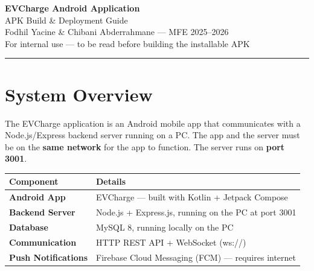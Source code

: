 \documentclass[12pt,a4paper]{article}
\begin{document}

\begin{center}
  {\LARGE\bfseries\color{primary} EVCharge Android Application}\\[0.4em]
  {\large\color{accent} APK Build \& Deployment Guide}\\[0.6em]
  {\normalsize Fodhil Yacine \& Chibani Abderrahmane \quad --- \quad MFE 2025--2026}\\[0.2em]
  {\small\color{gray} For internal use --- to be read before building the installable APK}
\end{center}

\vspace{0.5em}
\noindent\color{accent}\rule{\linewidth}{1.5pt}
\vspace{1em}

\section{System Overview}

The EVCharge application is an Android mobile app that communicates with a
Node.js/Express backend server running on a PC. The app and the server must be
on the \textbf{same network} for the app to function. The server runs on
\textbf{port 3001}.

\begin{center}
\renewcommand{\arraystretch}{1.4}
\begin{tabular}{|>{\bfseries}p{4cm}|p{9cm}|}
  \hline
  Component       & Details \\ \hline
  Android App     & EVCharge --- built with Kotlin + Jetpack Compose \\ \hline
  Backend Server  & Node.js + Express.js, running on the PC at port 3001 \\ \hline
  Database        & MySQL 8, running locally on the PC \\ \hline
  Communication   & HTTP REST API + WebSocket (ws://) \\ \hline
  Push Notifications & Firebase Cloud Messaging (FCM) --- requires internet \\ \hline
\end{tabular}
\end{center}

\end{document}
